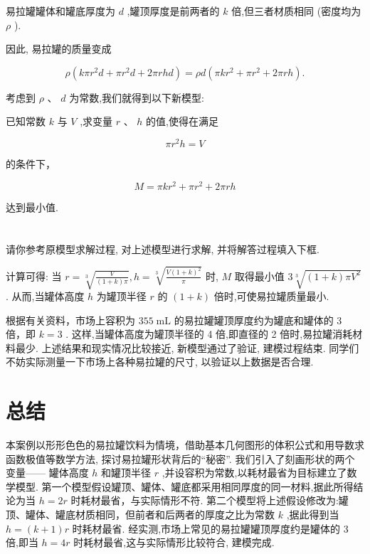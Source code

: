 \documentclass[10pt]{article}
\begin{document}
易拉罐罐体和罐底厚度为 \(d\) ,罐顶厚度是前两者的 \(k\) 倍,但三者材质相同 (密度均为 \(\rho\) ).

因此, 易拉罐的质量变成

\[
\rho \left( {{k\pi }{r}^{2}d + \pi {r}^{2}d + {2\pi rhd}}\right)  = {\rho d}\left( {{\pi k}{r}^{2} + \pi {r}^{2} + {2\pi rh}}\right) .
\]

考虑到 \(\rho \text{ 、 }d\) 为常数,我们就得到以下新模型:

已知常数 \(k\) 与 \(V\) ,求变量 \(r\text{ 、 }h\) 的值,使得在满足

\[
\pi {r}^{2}h = V
\]

的条件下，

\[
M = {\pi k}{r}^{2} + \pi {r}^{2} + {2\pi rh}
\]

达到最小值.

\section*{}

请你参考原模型求解过程, 对上述模型进行求解, 并将解答过程填入下框.

计算可得: 当 \(r = \sqrt[3]{\frac{V}{\left( {1 + k}\right) \pi }},h = \sqrt[3]{\frac{V{\left( 1 + k\right) }^{2}}{\pi }}\) 时, \(M\) 取得最小值 \(3\sqrt[3]{\left( {1 + k}\right) \pi {V}^{2}}\) . 从而,当罐体高度 \(h\) 为罐顶半径 \(r\) 的 \(\left( {1 + k}\right)\) 倍时,可使易拉罐质量最小.

根据有关资料，市场上容积为 \({355}\mathrm{\;{mL}}\) 的易拉罐罐顶厚度约为罐底和罐体的 3 倍，即 \(k = 3\) . 这样,当罐体高度为罐顶半径的 4 倍,即直径的 2 倍时,易拉罐消耗材料最少. 上述结果和现实情况比较接近, 新模型通过了验证, 建模过程结束. 同学们不妨实际测量一下市场上各种易拉罐的尺寸, 以验证以上数据是否合理.

\section*{总结}

本案例以形形色色的易拉罐饮料为情境，借助基本几何图形的体积公式和用导数求函数极值等数学方法, 探讨易拉罐形状背后的“秘密”. 我们引入了刻画形状的两个变量—— 罐体高度 \(h\) 和罐顶半径 \(r\) ,并设容积为常数,以耗材最省为目标建立了数学模型. 第一个模型假设罐顶、罐体、罐底都采用相同厚度的同一材料,据此所得结论为当 \(h = {2r}\) 时耗材最省，与实际情形不符. 第二个模型将上述假设修改为:罐顶、罐体、罐底材质相同，但前者和后两者的厚度之比为常数 \(k\) ,据此得到当 \(h = \left( {k + 1}\right) r\) 时耗材最省. 经实测,市场上常见的易拉罐罐顶厚度约是罐体的 3 倍,即当 \(h = {4r}\) 时耗材最省,这与实际情形比较符合, 建模完成.
\end{document}
